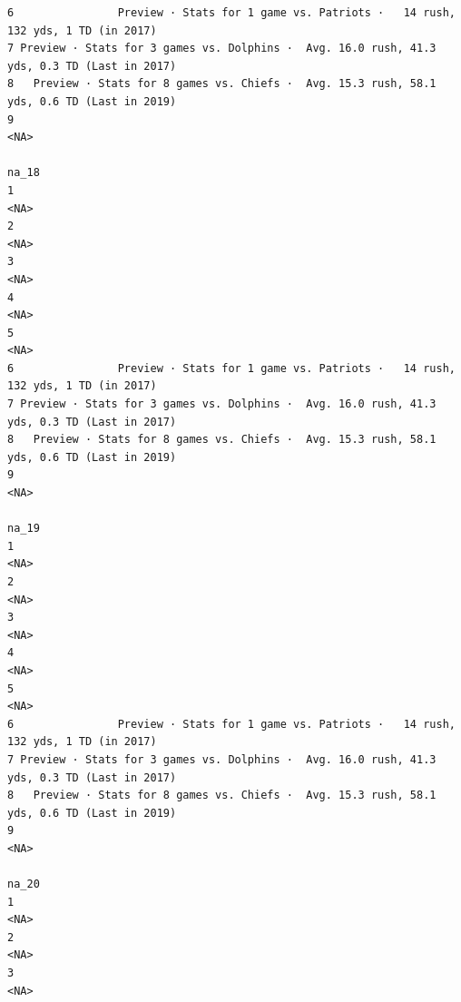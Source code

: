 \documentclass[
]{article}
\begin{document}
\begin{verbatim}
6                Preview · Stats for 1 game vs. Patriots ·   14 rush, 132 yds, 1 TD (in 2017)
7 Preview · Stats for 3 games vs. Dolphins ·  Avg. 16.0 rush, 41.3 yds, 0.3 TD (Last in 2017)
8   Preview · Stats for 8 games vs. Chiefs ·  Avg. 15.3 rush, 58.1 yds, 0.6 TD (Last in 2019)
9                                                                                        <NA>
                                                                                        na_18
1                                                                                        <NA>
2                                                                                        <NA>
3                                                                                        <NA>
4                                                                                        <NA>
5                                                                                        <NA>
6                Preview · Stats for 1 game vs. Patriots ·   14 rush, 132 yds, 1 TD (in 2017)
7 Preview · Stats for 3 games vs. Dolphins ·  Avg. 16.0 rush, 41.3 yds, 0.3 TD (Last in 2017)
8   Preview · Stats for 8 games vs. Chiefs ·  Avg. 15.3 rush, 58.1 yds, 0.6 TD (Last in 2019)
9                                                                                        <NA>
                                                                                        na_19
1                                                                                        <NA>
2                                                                                        <NA>
3                                                                                        <NA>
4                                                                                        <NA>
5                                                                                        <NA>
6                Preview · Stats for 1 game vs. Patriots ·   14 rush, 132 yds, 1 TD (in 2017)
7 Preview · Stats for 3 games vs. Dolphins ·  Avg. 16.0 rush, 41.3 yds, 0.3 TD (Last in 2017)
8   Preview · Stats for 8 games vs. Chiefs ·  Avg. 15.3 rush, 58.1 yds, 0.6 TD (Last in 2019)
9                                                                                        <NA>
                                                                                        na_20
1                                                                                        <NA>
2                                                                                        <NA>
3                                                                                        <NA>

\end{verbatim}
\end{document}

